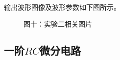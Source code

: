 \documentclass[a4paper]{article}
\begin{document}
    {{输出波形图像及波形参数如下图所示。}}

    \begin{figure}[htb]
        \centering
        \caption{\small 图十：实验二相关图片}
    \end{figure}

    \subsection{一阶$RC$微分电路}\label{subsec:$rc$9}
\end{document}
